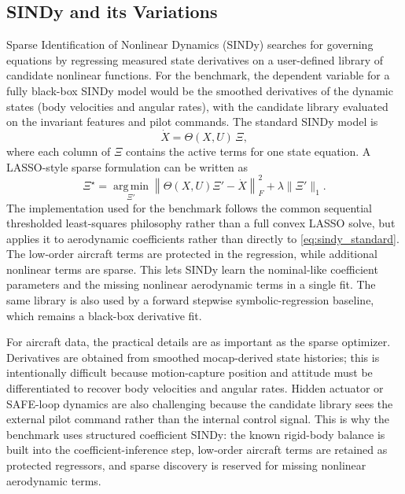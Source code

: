 \documentclass[11pt]{article}
\begin{document}
\subsection{SINDy and its Variations}
Sparse Identification of Nonlinear Dynamics (SINDy) searches for governing
equations by regressing measured state derivatives on a user-defined library of
candidate nonlinear functions. For the benchmark, the dependent variable for a
fully black-box SINDy model would be the smoothed derivatives of the dynamic
states (body velocities and angular rates), with the candidate library
evaluated on the invariant features and pilot commands. The standard SINDy model is
\begin{equation}
    \dot{X} = \Theta(X,U)\,\Xi,
    \label{eq:sindy_standard}
\end{equation}
where each column of $\Xi$ contains the active terms for one state equation. A
LASSO-style sparse formulation can be written as
\begin{equation}
    \Xi^\star
    =
    \operatorname*{arg\,min}_{\Xi'}
    \left\|
    \Theta(X,U)\Xi' - \dot{X}
    \right\|_F^2
    +\lambda\|\Xi'\|_1 .
    \label{eq:sindy_lasso}
\end{equation}
The implementation used for the benchmark follows the common sequential
thresholded least-squares philosophy rather than a full convex LASSO solve, but
applies it to aerodynamic coefficients rather than directly to
\eqref{eq:sindy_standard}. The low-order aircraft terms are protected in the
regression, while additional nonlinear terms are sparse. This lets SINDy learn
the nominal-like coefficient parameters and the missing nonlinear aerodynamic
terms in a single fit. The same library is also used by a forward stepwise
symbolic-regression baseline, which remains a black-box derivative fit.

For aircraft data, the practical details are as important as the sparse
optimizer. Derivatives are obtained from smoothed mocap-derived state
histories; this is intentionally difficult
because motion-capture position and attitude must be differentiated to recover
body velocities and angular rates. Hidden actuator
or SAFE-loop dynamics are also challenging because the candidate library sees
the external pilot command rather than the internal control signal. This is why
the benchmark uses structured coefficient SINDy: the known rigid-body balance is
built into the coefficient-inference step, low-order aircraft terms are retained
as protected regressors, and sparse discovery is reserved for missing nonlinear
aerodynamic terms.
\end{document}
